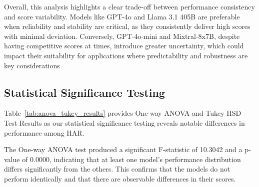 Overall, this analysis highlights a clear trade-off between performance consistency and score variability. Models like GPT-4o and Llama 3.1 405B are preferable when reliability and stability are critical, as they consistently deliver high scores with minimal deviation. Conversely, GPT-4o-mini and Mixtral-8x7B, despite having competitive scores at times, introduce greater uncertainty, which could impact their suitability for applications where predictability and robustness are key considerations











\subsection{Statistical Significance Testing}
Table~\ref{tab:anova_tukey_results} provides One-way ANOVA and Tukey HSD Test Results as our statistical significance testing reveals notable differences in performance among HAR.

The One-way ANOVA test produced a significant F-statistic of 10.3042 and a p-value of 0.0000, indicating that at least one model's performance distribution differs significantly from the others. This confirms that the models do not perform identically and that there are observable differences in their scores.

